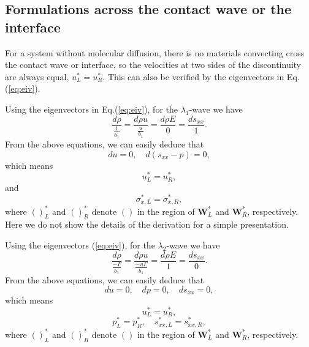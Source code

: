\documentclass{article}
\numberwithin{equation}{section}
\numberwithin{table}{section}
\begin{document}
\subsection{Formulations across the  contact wave or the interface}
  For  a  system without molecular diffusion, there is no materials convecting  cross the contact wave or interface, so the velocities at two sides of  the discontinuity are always equal, $u_L^* = u_R^*$. This can also be verified by the eigenvectors  in Eq.(\ref{eq:eiv}).

  Using the eigenvectors in  Eq.(\ref{eq:eiv}), for the $\lambda_{1}$-wave we
have
\begin{equation}   \label{e23a}
\frac{d \rho}{\frac{1}{b_{1}}} = \frac{d \rho u}{\frac{u
}{b_{1}}}=\frac{d \rho E}{0} = \frac{d s_{xx}}{1}.
\end{equation}
From the above equations, we can easily deduce that
\begin{equation}   \label{e23b}
du = 0, \quad d(s_{xx}-p)=0,
\end{equation}
 which means
\begin{equation}   \label{e23c}
  u_{L}^{\ast}=u_{R}^{\ast},
\end{equation}
and
\begin{equation}   \label{e23d}
\sigma_{x,L}^{\ast}=\sigma_{x,R}^{\ast},
\end{equation}
where $()_{L}^{\ast}$ and $()_{R}^{\ast}$ denote $()$ in the region
of $\mathbf{W}_{L}^{\ast}$ and $\mathbf{W}_{R}^{\ast}$,
respectively. Here we do not show the details of the derivation for a simple
 presentation.


Using the eigenvectors (\ref{eq:eiv}), for the $\lambda_{2}$-wave we
have
\begin{equation}   \label{e24a}
\frac{d \rho}{\frac{-\Gamma}{b_{1}}} = \frac{d \rho u}{\frac{-u
\Gamma}{b_{1}}}=\frac{d \rho E}{1} = \frac{d s_{xx}}{0}.
\end{equation}
From the above equations, we can easily deduce  that
\begin{equation}   \label{e24b}
du = 0, \quad dp=0, \quad ds_{xx}=0,
\end{equation}
 which means
\begin{equation}   \label{e24c}
  u_{L}^{\ast}=u_{R}^{\ast},
\end{equation}
\begin{equation}   \label{e24d}
p_{L}^{\ast}=p_{R}^{\ast}, \quad
  s_{xx,L}^{\ast}=s_{xx,R}^{\ast},
\end{equation}
where $()_{L}^{\ast}$ and $()_{R}^{\ast}$ denote $()$ in the region
of $\mathbf{W}_{L}^{\ast}$ and $\mathbf{W}_{R}^{\ast}$,
respectively.
\end{document}
